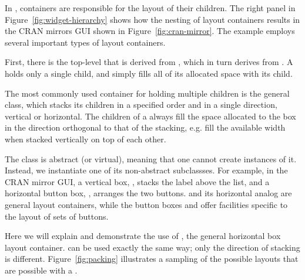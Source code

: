 \documentclass[article,shortnames]{jss}
\begin{document}
In , containers are responsible for the layout of their
children. The right panel in Figure~\ref{fig:widget-hierarchy} shows
how the nesting of layout containers results in the CRAN mirrors GUI
shown in Figure~\ref{fig:cran-mirror}. The example employs several
important types of  layout containers. 

First, there is the
top-level  that is derived from , which
in turn derives from .  A  holds only
a single child, and  simply fills all of its allocated
space with its child. 

The most commonly used container for holding
multiple children is the general  class, which stacks its
children in a specified order and in a single direction, vertical or
horizontal. The children of a  always fill the space
allocated to the box in the direction orthogonal to that of the
stacking, e.g. fill the available width when stacked vertically on top
of each other. 

The  class is abstract (or virtual), meaning
that one cannot create instances of it. Instead, we instantiate one of
its non-abstract subclassses.  For example, in the CRAN mirror GUI, a
vertical box, , stacks the label above the list, and a
horizontal button box, , arranges the two
buttons.  and its horizontal analog  are
general
layout containers, while the button boxes 
and  offer facilities specific to the layout of
sets of buttons.

Here we will explain and demonstrate the use of , the
general horizontal box layout container.  can be used
exactly the same way; only the direction of stacking is different.
Figure~\ref{fig:packing} illustrates a sampling of the possible
layouts that are possible with a .
\end{document}
